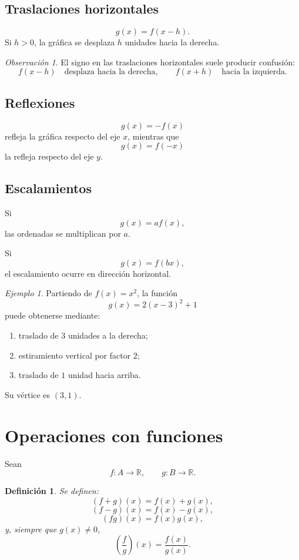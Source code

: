 \documentclass[12pt]{article}
\newtheorem{definicion}{Definición}[section]
\theoremstyle{remark}
\newtheorem{observacion}{Observación}[section]
\newtheorem{ejemplo}{Ejemplo}[section]
\newcommand{\R}{\mathbb{R}}
\begin{document}
\subsection{Traslaciones horizontales}

\[
g(x)=f(x-h).
\]
Si $h>0$, la gráfica se desplaza $h$ unidades hacia la derecha.

\begin{observacion}
El signo en las traslaciones horizontales suele producir confusión:
\[
f(x-h)\quad\text{desplaza hacia la derecha},
\qquad
f(x+h)\quad\text{hacia la izquierda}.
\]
\end{observacion}

\subsection{Reflexiones}

\[
g(x)=-f(x)
\]
refleja la gráfica respecto del eje $x$, mientras que
\[
g(x)=f(-x)
\]
la refleja respecto del eje $y$.

\subsection{Escalamientos}

Si
\[
g(x)=af(x),
\]
las ordenadas se multiplican por $a$.

Si
\[
g(x)=f(bx),
\]
el escalamiento ocurre en dirección horizontal.

\begin{ejemplo}
Partiendo de $f(x)=x^2$, la función
\[
g(x)=2(x-3)^2+1
\]
puede obtenerse mediante:
\begin{enumerate}
    \item traslado de $3$ unidades a la derecha;
    \item estiramiento vertical por factor $2$;
    \item traslado de $1$ unidad hacia arriba.
\end{enumerate}
Su vértice es $(3,1)$.
\end{ejemplo}

\section{Operaciones con funciones}

Sean
\[
f:A\to\R,\qquad g:B\to\R.
\]

\begin{definicion}
Se definen:
\[
(f+g)(x)=f(x)+g(x),
\]
\[
(f-g)(x)=f(x)-g(x),
\]
\[
(fg)(x)=f(x)g(x),
\]
y, siempre que $g(x)\neq0$,
\[
\left(\frac{f}{g}\right)(x)=\frac{f(x)}{g(x)}.
\]
\end{definicion}
\end{document}
